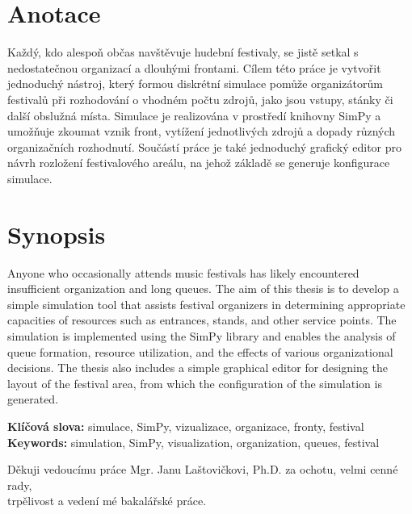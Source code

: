 \documentclass[12pt,a4paper]{article}
\begin{document}
\clearpage
\clearpage
\section*{Anotace}

Každý, kdo alespoň občas navštěvuje hudební festivaly, se jistě setkal s nedostatečnou organizací a dlouhými frontami. Cílem této práce je vytvořit jednoduchý nástroj, který formou diskrétní simulace pomůže organizátorům festivalů při rozhodování o vhodném počtu zdrojů, jako jsou vstupy, stánky či další obslužná místa. Simulace je realizována v prostředí knihovny SimPy a umožňuje zkoumat vznik front, vytížení jednotlivých zdrojů a dopady různých organizačních rozhodnutí. Součástí práce je také jednoduchý grafický editor pro návrh rozložení festivalového areálu, na jehož základě se generuje konfigurace simulace.

\vspace{1cm}

\section*{Synopsis}

Anyone who occasionally attends music festivals has likely encountered insufficient organization and long queues. The aim of this thesis is to develop a simple simulation tool that assists festival organizers in determining appropriate capacities of resources such as entrances, stands, and other service points. The simulation is implemented using the SimPy library and enables the analysis of queue formation, resource utilization, and the effects of various organizational decisions. The thesis also includes a simple graphical editor for designing the layout of the festival area, from which the configuration of the simulation is generated.

\vspace{1cm}

\textbf{Klíčová slova:} simulace, SimPy, vizualizace, organizace, fronty, festival\\
\textbf{Keywords:} simulation, SimPy, visualization, organization, queues, festival

\clearpage

{\Large
Děkuji vedoucímu práce Mgr. Janu Laštovičkovi, Ph.D. za ochotu, velmi cenné rady,\\
trpělivost a vedení mé bakalářské práce.
}

\vspace{2cm}
\end{document}

